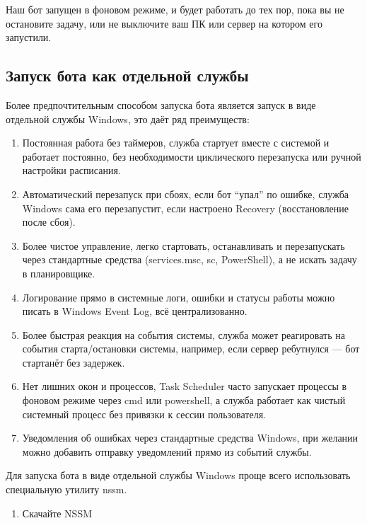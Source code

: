 \documentclass[
]{book}
\providecommand{\tightlist}{%
  \setlength{\itemsep}{0pt}\setlength{\parskip}{0pt}}
\begin{document}
Наш бот запущен в фоновом режиме, и будет работать до тех пор, пока вы не остановите задачу, или не выключите ваш ПК или сервер на котором его запустили.

\subsection{Запуск бота как отдельной службы}\label{ux437ux430ux43fux443ux441ux43a-ux431ux43eux442ux430-ux43aux430ux43a-ux43eux442ux434ux435ux43bux44cux43dux43eux439-ux441ux43bux443ux436ux431ux44b}

Более предпочтительным способом запуска бота является запуск в виде отдельной службы Windows, это даёт ряд преимуществ:

\begin{enumerate}
\def\labelenumi{\arabic{enumi}.}
\tightlist
\item
  Постоянная работа без таймеров, служба стартует вместе с системой и работает постоянно, без необходимости циклического перезапуска или ручной настройки расписания.
\item
  Автоматический перезапуск при сбоях, если бот ``упал'' по ошибке, служба Windows сама его перезапустит, если настроено Recovery (восстановление после сбоя).
\item
  Более чистое управление, легко стартовать, останавливать и перезапускать через стандартные средства (services.msc, sc, PowerShell), а не искать задачу в планировщике.
\item
  Логирование прямо в системные логи, ошибки и статусы работы можно писать в Windows Event Log, всё централизованно.
\item
  Более быстрая реакция на события системы, служба может реагировать на события старта/остановки системы, например, если сервер ребутнулся --- бот стартанёт без задержек.
\item
  Нет лишних окон и процессов, Task Scheduler часто запускает процессы в фоновом режиме через cmd или powershell, а служба работает как чистый системный процесс без привязки к сессии пользователя.
\item
  Уведомления об ошибках через стандартные средства Windows, при желании можно добавить отправку уведомлений прямо из событий службы.
\end{enumerate}

Для запуска бота в виде отдельной службы Windows проще всего использовать специальную утилиту nssm.

\begin{enumerate}
\def\labelenumi{\arabic{enumi}.}
\tightlist
\item
  Скачайте NSSM
\end{enumerate}
\end{document}
